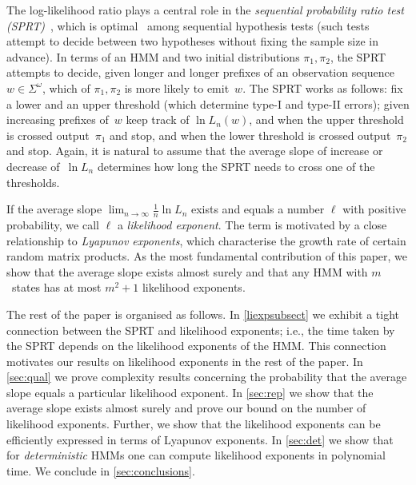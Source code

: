 \documentclass[a4paper,UKenglish,cleveref, autoref,mathscr]{lipics-v2019}
\newcommand{\1}{\mathbbm{1}}
\newcommand{\liexp}{\lim_{n\rightarrow\infty} \frac1n \ln L_n}
\begin{document}
The log-likelihood ratio plays a central role in the \emph{sequential probability ratio test (SPRT)}~\cite{wald45}, which is  optimal~\cite{WaldWolfowitz48} among sequential hypothesis tests (such tests attempt to decide between two hypotheses without fixing the sample size in advance).
In terms of an HMM and two initial distributions $\pi_1, \pi_2$, the SPRT attempts to decide, given longer and longer prefixes of an observation sequence $w \in \Sigma^\omega$, which of $\pi_1, \pi_2$ is more likely to emit~$w$.
The SPRT works as follows: fix a lower and an upper threshold (which determine type-I and type-II errors); given increasing prefixes of~$w$ keep track of $\ln L_n(w)$, and when the upper threshold is crossed output~$\pi_1$ and stop, and when the lower threshold is crossed output~$\pi_2$ and stop.
Again, it is natural to assume that the average slope of increase or decrease of~$\ln L_n$ determines how long the SPRT needs to cross one of the thresholds.

If the average slope $\liexp$ exists and equals a number $\ell$ with positive probability, we call $\ell$ a \emph{likelihood exponent}.
The term is motivated by a close relationship to \emph{Lyapunov exponents}, which characterise the growth rate of certain random matrix products.
As the most fundamental contribution of this paper, we show that the average slope exists almost surely and that any HMM with $m$~states has at most $m^2 + 1$ likelihood exponents.

The rest of the paper is organised as follows.
In \cref{liexpsubsect} we exhibit a tight connection between the SPRT and likelihood exponents; i.e., the time taken by the SPRT depends on the likelihood exponents of the HMM.
This connection motivates our results on likelihood exponents in the rest of the paper.
In \cref{sec:qual} we prove complexity results concerning the probability that the average slope equals a particular likelihood exponent.
In \cref{sec:rep} we show that the average slope exists almost surely and prove our bound on the number of likelihood exponents.
Further, we show that the likelihood exponents can be efficiently expressed in terms of Lyapunov exponents.
In \cref{sec:det} we show that for \emph{deterministic} HMMs one can compute likelihood exponents in polynomial time.
We conclude in \cref{sec:conclusions}.
\end{document}
